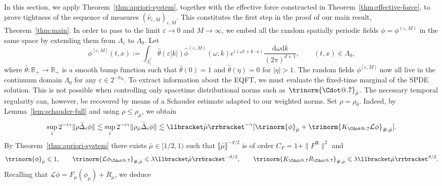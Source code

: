 \documentclass{article}
\makeatletter
\numberwithin{equation}{section}
\newcommand{\assign}{:=}
\newcommand{\mathd}{\mathrm{d}}
\newcommand*\Cdot{{\mathpalette\Cdot@{.7}}}
\newcommand*\Cdot@[2]{\mathbin{\vcenter{\hbox{\scalebox{#2}{\hspace{0.1mm}$\m@th#1\bullet$\hspace{0.1mm}}}}}}
\theoremstyle{plain}
\theoremstyle{definition}
\makeatother
\begin{document}
In this section, we apply Theorem~\ref{thm:apriori-system}, together with the
effective force constructed in Theorem~\ref{thm:effective-force}, to prove
tightness of the sequence of measures ${(\hat{\nu}_{\varepsilon,
M})_{\varepsilon, M}} $. This constitutes the first step in the proof of our
main result, Theorem~\ref{thm:main}. In order to pass to the limit
$\varepsilon \rightarrow 0$ and $M \rightarrow \infty$, we embed all the random
spatially periodic fields $\phi = \phi^{(\varepsilon, M)}$ in the same space
by extending them from $\Lambda_{\varepsilon}$ to $\Lambda_0$. Let
\begin{equation}
  \phi^{[\varepsilon, M]} (t, x) \assign \int_{\Lambda^{\ast}_{\varepsilon}} 
  \hat{\theta} (\varepsilon | k |)  \hat{\phi}^{(\varepsilon, M)} (\omega, k)
  e^{i (\omega t + k \cdot x)} \frac{\mathd \omega \mathd k}{(2 \pi)^{d + 1}},
  \qquad (t, x) \in \Lambda_0, \label{eq:embedding}
\end{equation}
where \(\hat{\theta}:\mathbb{R}_+\to\mathbb{R}_+\) is a smooth bump function such that
\(\hat{\theta}(0)=1\) and \(\hat{\theta}(\eta)=0\) for \(|\eta|>1\). The
random fields $\phi^{[\varepsilon, M]}$ now all live in the continuum domain
$\Lambda_0$ for any $\varepsilon \in 2^{-\mathbb{N}_0}$. To extract
information about the EQFT, we must evaluate the fixed-time marginal of
the SPDE solution. This is not possible when controlling only spacetime
distributional norms such as~$\trinorm{ \Cdot }_{\bar{\mu}}$.
The necessary temporal regularity can, however, be recovered by means of a
Schauder estimate adapted to our weighted norms. Set $\rho = \rho_0$.
Indeed, by Lemma~\ref{lem:schauder-full} and using $\rho \leqslant \rho_{\bar{\mu}}$, we
obtain
\[ \sup_i 2^{- i \gamma} \| \rho  \bar{\Delta}_i  \phi \| \lesssim \sup_i 2^{-
   i \gamma} \| \rho_{\bar{\mu}} \bar{\Delta}_i  \phi \|  \lesssim \llbracket
   \bar{\mu} \rrbracket^{- \gamma} [\trinorm{ \phi }_{\bar{\mu}} +
   \trinorm{ K_{\Cdot} \mathcal{L} \phi }_{\#, \bar{\mu}}] . \]
By Theorem~\ref{thm:apriori-system} there exists $\bar{\mu} \in [1 / 2, 1)$
such that $\llbracket \bar{\mu} \rrbracket^{- \vartheta / 2}$ is of order $C_F
= 1 + \| F^{\mathfrak{A}} \|^2$ and
\[ \trinorm{ \phi }_{\bar{\mu}} \leqslant 1, \qquad \trinorm{
   \mathcal{L} \phi_{\Cdot} }_{\#, \bar{\mu}} \leqslant \lambda
   \llbracket \bar{\mu} \rrbracket^{- \vartheta / 2}, \qquad \trinorm{
   K_{\Cdot} R_{\Cdot} }_{\#, \bar{\mu}} \leqslant \lambda
   \llbracket \bar{\mu} \rrbracket^{\vartheta / 2} . \]
Recalling that $\mathcal{L} \phi = F_{\mu} (\phi_{\mu}) + R_{\mu}$, we deduce
\end{document}
